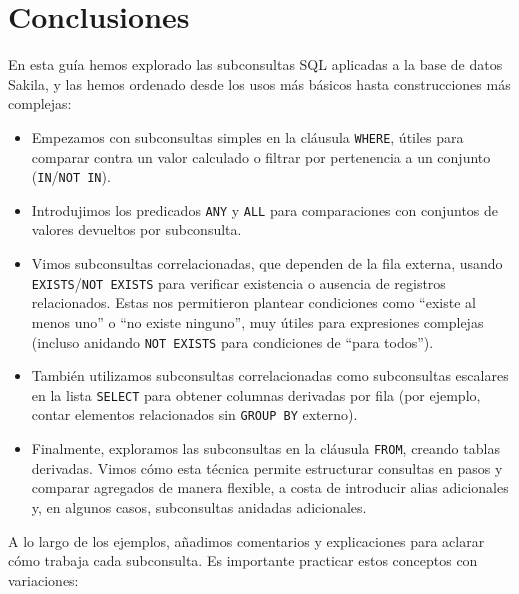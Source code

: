 \documentclass[12pt,a4paper]{article}
\begin{document}
\section*{Conclusiones} En esta guía hemos explorado las subconsultas SQL aplicadas a la base de datos Sakila, y las hemos ordenado desde los usos más básicos hasta construcciones más complejas:



\begin{itemize}
\item Empezamos con subconsultas simples en la cláusula \texttt{WHERE}, útiles para comparar contra un valor calculado o filtrar por pertenencia a un conjunto (\texttt{IN}/\texttt{NOT IN}).
\item Introdujimos los predicados \texttt{ANY} y \texttt{ALL} para comparaciones con conjuntos de valores devueltos por subconsulta.
\item Vimos subconsultas correlacionadas, que dependen de la fila externa, usando \texttt{EXISTS}/\texttt{NOT EXISTS} para verificar existencia o ausencia de registros relacionados.
%
Estas nos permitieron plantear condiciones como “existe al menos uno” o “no existe ninguno”, muy útiles para expresiones complejas (incluso anidando \texttt{NOT EXISTS} para condiciones de “para todos”).
\item También utilizamos subconsultas correlacionadas como subconsultas escalares en la lista \texttt{SELECT} para obtener columnas derivadas por fila (por ejemplo, contar elementos relacionados sin \texttt{GROUP BY} externo).
\item Finalmente, exploramos las subconsultas en la cláusula \texttt{FROM}, creando tablas derivadas.
%
Vimos cómo esta técnica permite estructurar consultas en pasos y comparar agregados de manera flexible, a costa de introducir alias adicionales y, en algunos casos, subconsultas anidadas adicionales.
\end{itemize} 

A lo largo de los ejemplos, añadimos comentarios y explicaciones para aclarar cómo trabaja cada subconsulta.
%
Es importante practicar estos conceptos con variaciones:
\end{document}
